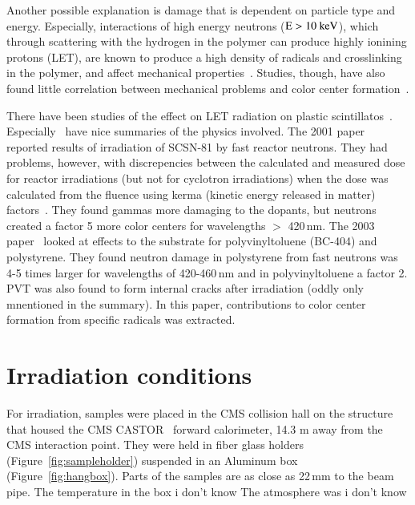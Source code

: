 \documentclass[review]{elsarticle}
\begin{document}
Another possible explanation is damage that is dependent on particle
type and energy.   Especially, interactions of high energy neutrons
(${\rm E>10~keV}$), which through scattering with the hydrogen in the
polymer can produce highly ionining protons (LET), are known to
produce a high density of radicals and crosslinking in the polymer,
and affect mechanical properties~\cite{lee199929}.
Studies, though, have also found little correlation between mechanical
problems and color center formation~\cite{clough1996583}.

There have been studies of the effect on LET radiation
on plastic scintillatos~\cite{34504,467829,Bodmann2003495,Bodmann2001299}.
Especially~\cite{Bodmann2001299,Bodmann2003495} have nice summaries of the physics involved.
The 2001 paper~\cite{Bodmann2001299} reported results of irradiation of SCSN-81 by fast
reactor neutrons.  They had problems, however, with discrepencies between the calculated and measured dose for reactor irradiations (but not for cyclotron irradiations) when the dose was calculated from the fluence using
kerma (kinetic energy released in matter) factors~\cite{kerma}.
They found gammas more damaging to the dopants, but neutrons created a factor 5 more color centers for wavelengths $>$ 420\,nm.
The 2003 paper~\cite{Bodmann2003495} looked at effects to the substrate
for  polyvinyltoluene (BC-404) and polystyrene.
They found neutron damage in polystyrene from fast neutrons was 4-5
times larger for wavelengths of 420-460\,nm and in polyvinyltoluene
a factor 2.  PVT was also found to form internal cracks after irradiation
(oddly only mnentioned in the summary).
In this paper,
contributions to color center formation from specific radicals
was extracted.




\section{Irradiation conditions}
\label{sec:radiation}

For irradiation,
samples were placed in the CMS collision hall
on the structure that housed the CMS CASTOR~\cite{castor}
forward calorimeter, 14.3 m away from the CMS interaction point.
They were held in fiber glass holders (Figure~\ref{fig:sampleholder})
suspended in an Aluminum box (Figure~\ref{fig:hangbox}).
Parts of the samples are as close as 22\,mm
to the beam pipe.
The temperature in the box {\color{red} i don't know}
The atmosphere was  {\color{red} i don't know}
\end{document}
